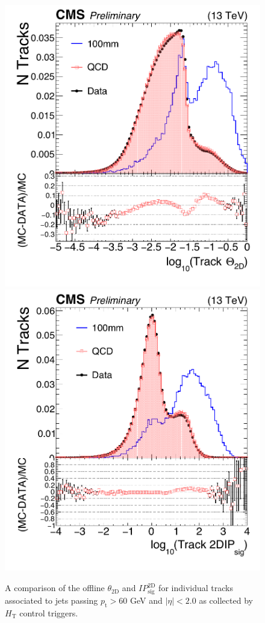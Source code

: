 \begin{figure}
\begin{center}
\includegraphics[width=.45\textwidth]{figures/an/SYSTEMATICS/76x_pu/SYS_offline_theta.pdf}
\includegraphics[width=.45\textwidth]{figures/an/SYSTEMATICS/76x_pu/SYS_offline_2dipsig.pdf}
\caption{A comparison of the offline $\theta_{\textrm{2D}}$ and $IP_{\textrm{sig}}^{\textrm{2D}}$ for individual tracks associated to jets passing
 $p_{\textrm{t}} > 60$ GeV and $|\eta| <2.0$ as collected by $H_{\textrm{T}}$ control triggers. \label{fig:variable_modeling}} 
\end{center}
\end{figure}


